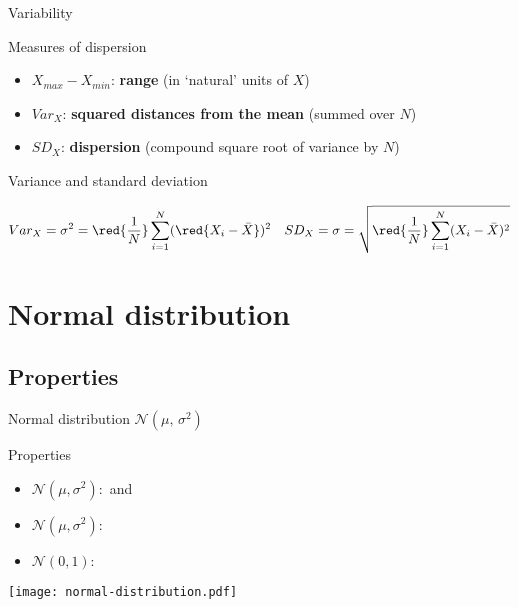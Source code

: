 \documentclass[t]{beamer}
\begin{document}
	\begin{frame}[t]{Variability}

		\begin{block}{Measures of dispersion}
			\begin{itemize}
				\item $X_{max} - X_{min}$: \textbf{range} (in `natural' units of $X$)
				\item $Var_X$: \textbf{squared distances from the mean} (summed over $N$)
				\item $SD_X$: \textbf{dispersion} (compound square root of variance by $N$)
			\end{itemize}
		\end{block}
	
	  \begin{block}{Variance and standard deviation}

			$$Var_X = \sigma^2 = \red{\frac{1}{N}} \sum_{i=1}^N (\red{X_i - \bar X})^2 \quad SD_X = \sigma = \sqrt{\red{\frac{1}{N}} \sum_{i=1}^N (X_i - \bar X)^2}$$

		\end{block}
	
	\end{frame}
	
	\section{Normal distribution}
	
	\subsection{Properties}
	
	\begin{frame}[t]{Normal distribution $\mathcal{N}(\mu,\,\sigma^2)$}
	
	\begin{block}{Properties}
		
		\begin{itemize}	
			\item $\mathcal{N}(\mu, \sigma^2):$  and 
			\item $\mathcal{N}(\mu, \sigma^2):$ 
			\item $\mathcal{N}(0, 1):$ 
		\end{itemize}

	\end{block}

	\begin{center}
		\texttt{[image: normal-distribution.pdf]}
	\end{center}
	
	\end{frame}
	
\end{document}
